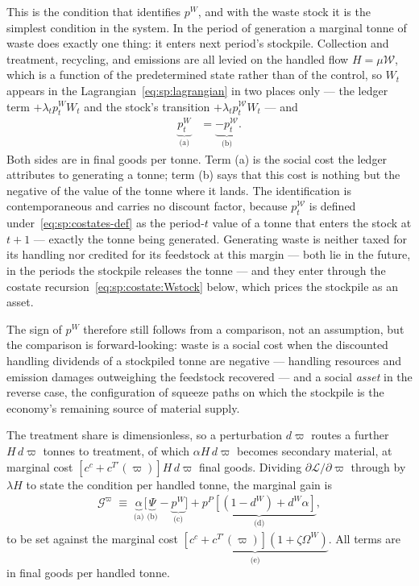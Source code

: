 This is the condition that identifies $p^W$, and with the waste stock it is the simplest condition in the system. In the period of generation a marginal tonne of waste does exactly one thing: it enters next period's stockpile. Collection and treatment, recycling, and emissions are all levied on the handled flow $H=\mu\mathcal W$, which is a function of the predetermined state rather than of the control, so $W_t$ appears in the Lagrangian~\eqref{eq:sp:lagrangian} in two places only --- the ledger term $+\lambda_t p^W_tW_t$ and the stock's transition $+\lambda_t p^{\mathcal W}_tW_t$ --- and
\begin{align}
\underbrace{p^W_t}_{\text{(a)}} &= \underbrace{-p^{\mathcal W}_t}_{\text{(b)}} .
\label{eq:sp:foc:W}
\end{align}
Both sides are in final goods per tonne. Term (a) is the social cost the ledger attributes to generating a tonne; term (b) says that this cost is nothing but the negative of the value of the tonne where it lands. The identification is contemporaneous and carries no discount factor, because $p^{\mathcal W}_t$ is defined under~\eqref{eq:sp:costates-def} as the period-$t$ value of a tonne that enters the stock at $t+1$ --- exactly the tonne being generated. Generating waste is neither taxed for its handling nor credited for its feedstock at this margin --- both lie in the future, in the periods the stockpile releases the tonne --- and they enter through the costate recursion~\eqref{eq:sp:costate:Wstock} below, which prices the stockpile as an asset.

The sign of $p^W$ therefore still follows from a comparison, not an assumption, but the comparison is forward-looking: waste is a social cost when the discounted handling dividends of a stockpiled tonne are negative --- handling resources and emission damages outweighing the feedstock recovered --- and a social \emph{asset} in the reverse case, the configuration of squeeze paths on which the stockpile is the economy's remaining source of material supply.

 The treatment share is dimensionless, so a perturbation $d\varpi$ routes a further $H\,d\varpi$ tonnes to treatment, of which $\alpha H\,d\varpi$ becomes secondary material, at marginal cost $\left[c^c+c^{T\prime}\left(\varpi\right)\right]H\,d\varpi$ final goods. Dividing $\partial\mathcal L/\partial\varpi$ through by $\lambda H$ to state the condition per handled tonne, the marginal gain is
\begin{align}
\mathcal G^\varpi \;\equiv\;
\underbrace{\alpha}_{\text{(a)}}\Big[\underbrace{\Psi}_{\text{(b)}}-\underbrace{p^W}_{\text{(c)}}\Big]
+\underbrace{p^P\left[\left(1-d^W\right)+d^W\alpha\right]}_{\text{(d)}} ,
\label{eq:sp:foc:varpi-gain}
\end{align}
to be set against the marginal cost $\underbrace{\left[c^c+c^{T\prime}\left(\varpi\right)\right]\left(1+\zeta\Omega^W\right)}_{\text{(e)}}$. All terms are in final goods per handled tonne.


